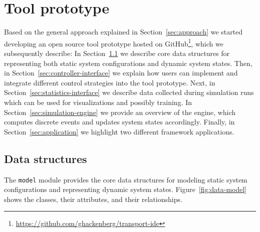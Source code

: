\documentclass[a4paper,twoside]{article}
\begin{document}
	\section{Tool prototype}
	\label{sec:tool-prototype}
	
	Based on the general approach explained in Section~\ref{sec:approach} we started developing an open source tool prototype hosted on GitHub\footnote{\url{https://github.com/ghackenberg/transport-ide}}, which we subsequently describe:
	In Section~\ref{sec:data-model} we describe core data structures for representing both static system configurations and dynamic system states.
	Then, in Section~\ref{sec:controller-interface} we explain how users can implement and integrate different control strategies into the tool prototype.
	Next, in Section~\ref{sec:statistics-interface} we describe data collected during simulation runs which can be used for visualizations and possibly training.
	In Section~\ref{sec:simulation-engine} we provide an overview of the engine, which computes discrete events and updates system states accordingly.
	Finally, in Section~\ref{sec:application} we highlight two different framework applications.
	
	\subsection{Data structures}
	\label{sec:data-model}
	
	The \texttt{model} module provides the core data structures for modeling static system configurations and representing dynamic system states.
	Figure~\ref{fig:data-model} shows the classes, their attributes, and their relationships.
	
\end{document}
